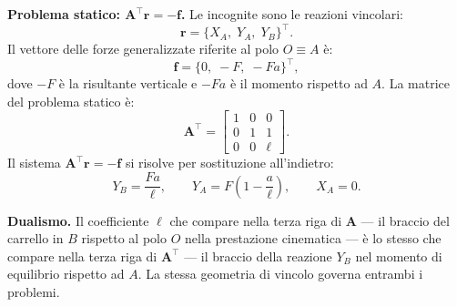 \begin{esempio}
\begin{svolgimento}
		\smallskip
		\noindent\textbf{Problema statico:
			$\bm{A}^{\top}\bm{r} = -\bm{f}$.}
		Le incognite sono le reazioni vincolari:
		\begin{equation*}
			\bm{r} =
			\bigl\{X_A,\; Y_A,\; Y_B
			\bigr\}^\top.
		\end{equation*}
		Il vettore delle forze generalizzate riferite al polo
		$O \equiv A$ è:
		\begin{equation*}
			\bm{f} =
			\bigl\{0,\; -F,\; -Fa
			\bigr\}^\top,
		\end{equation*}
		dove $-F$ è la risultante verticale e $-Fa$ è il
		momento rispetto ad $A$. La matrice del problema
		statico è:
		\begin{equation*}\label{eq:B_es1}
			\bm{A}^{\top} =
			\begin{bmatrix}
				1 & 0 & 0 \\
				0 & 1 & 1 \\
				0 & 0 & \ell
			\end{bmatrix}.
		\end{equation*}
		Il sistema $\bm{A}^{\top}\bm{r} = -\bm{f}$ si
		risolve per sostituzione all'indietro:
		\begin{equation*}
			Y_B = \frac{Fa}{\ell}, \qquad
			Y_A = F\left(1 - \frac{a}{\ell}\right), \qquad
			X_A = 0.
		\end{equation*}
		
		\noindent\textbf{Dualismo.}
		Il coefficiente $\ell$ che compare nella terza riga
		di $\bm{A}$ --- il braccio del carrello in $B$
		rispetto al polo $O$ nella prestazione cinematica
		--- è lo stesso che compare nella terza riga di
		$\bm{A}^\top$ --- il braccio della reazione $Y_B$
		nel momento di equilibrio rispetto ad $A$. La stessa
		geometria di vincolo governa entrambi i problemi.
	\end{svolgimento}
\end{esempio}

%

